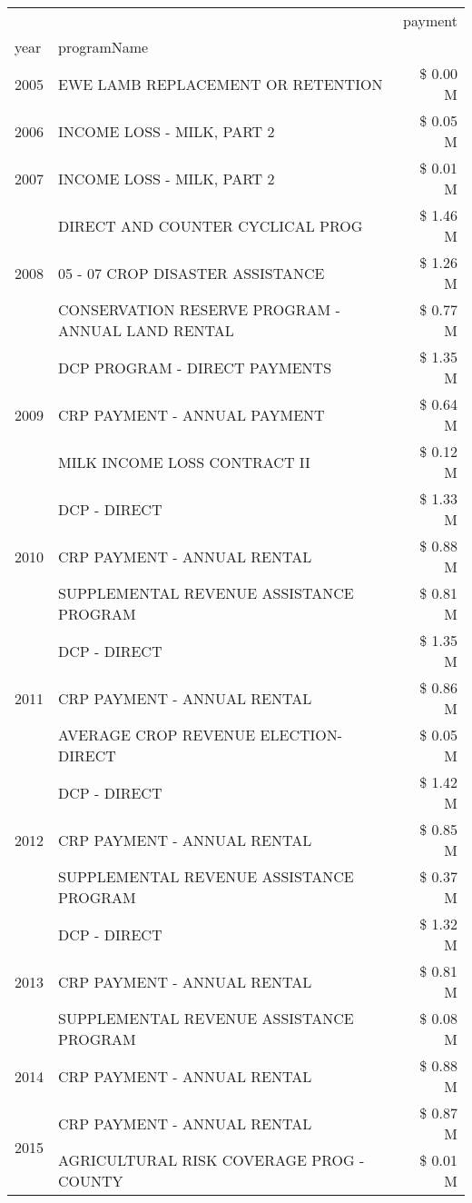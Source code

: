 \begin{tabular}{llr}
\toprule
 &  & payment \\
year & programName &  \\
\midrule
2005 & EWE LAMB REPLACEMENT OR RETENTION & \$ 0.00 M \\
\cline{1-3}
2006 & INCOME LOSS - MILK, PART 2 & \$ 0.05 M \\
\cline{1-3}
2007 & INCOME LOSS - MILK, PART 2 & \$ 0.01 M \\
\cline{1-3}
\multirow[t]{3}{*}{2008} & DIRECT AND COUNTER CYCLICAL PROG & \$ 1.46 M \\
 & 05 - 07 CROP DISASTER ASSISTANCE & \$ 1.26 M \\
 & CONSERVATION RESERVE PROGRAM - ANNUAL LAND RENTAL & \$ 0.77 M \\
\cline{1-3}
\multirow[t]{3}{*}{2009} & DCP PROGRAM - DIRECT PAYMENTS & \$ 1.35 M \\
 & CRP PAYMENT - ANNUAL PAYMENT & \$ 0.64 M \\
 & MILK INCOME LOSS CONTRACT II & \$ 0.12 M \\
\cline{1-3}
\multirow[t]{3}{*}{2010} & DCP - DIRECT & \$ 1.33 M \\
 & CRP PAYMENT - ANNUAL RENTAL & \$ 0.88 M \\
 & SUPPLEMENTAL REVENUE ASSISTANCE PROGRAM & \$ 0.81 M \\
\cline{1-3}
\multirow[t]{3}{*}{2011} & DCP - DIRECT & \$ 1.35 M \\
 & CRP PAYMENT - ANNUAL RENTAL & \$ 0.86 M \\
 & AVERAGE CROP REVENUE ELECTION-DIRECT & \$ 0.05 M \\
\cline{1-3}
\multirow[t]{3}{*}{2012} & DCP - DIRECT & \$ 1.42 M \\
 & CRP PAYMENT - ANNUAL RENTAL & \$ 0.85 M \\
 & SUPPLEMENTAL REVENUE ASSISTANCE PROGRAM & \$ 0.37 M \\
\cline{1-3}
\multirow[t]{3}{*}{2013} & DCP - DIRECT & \$ 1.32 M \\
 & CRP PAYMENT - ANNUAL RENTAL & \$ 0.81 M \\
 & SUPPLEMENTAL REVENUE ASSISTANCE PROGRAM & \$ 0.08 M \\
\cline{1-3}
2014 & CRP PAYMENT - ANNUAL RENTAL & \$ 0.88 M \\
\cline{1-3}
\multirow[t]{2}{*}{2015} & CRP PAYMENT - ANNUAL RENTAL & \$ 0.87 M \\
 & AGRICULTURAL RISK COVERAGE PROG - COUNTY & \$ 0.01 M \\

\end{tabular}
